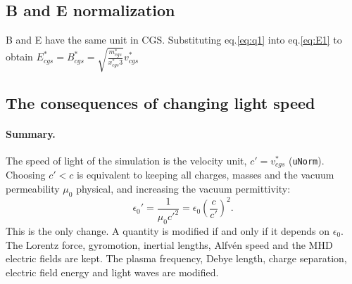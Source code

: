 \documentclass[a4paper, 11pt]{article}
\begin{document}
\subsection{B and E normalization}

B and E have the same unit in CGS. Substituting eq.\ref{eq:q1} into eq.\ref{eq:E1} to obtain $E_{cgs}^* = B_{cgs}^* = \sqrt{\frac{m_{cgs}^*}{x_{cgs}^*3}}v_{cgs}^*$ 

\subsection{The consequences of changing light speed}
\label{sec:light_speed}

\paragraph{Summary.} The speed of light of the simulation is the velocity unit, $c' = v_{cgs}^*$ (\texttt{uNorm}). Choosing $c' < c$ is equivalent to keeping all charges, masses and the vacuum permeability $\mu_0$ physical, and increasing the vacuum permittivity:
\begin{equation}
\epsilon_0' = \frac{1}{\mu_0 c'^2} = \epsilon_0 \left(\frac{c}{c'}\right)^2 .
\end{equation}
This is the only change. A quantity is modified if and only if it depends on $\epsilon_0$. The Lorentz force, gyromotion, inertial lengths, Alfv\'en speed and the MHD electric fields are kept. The plasma frequency, Debye length, charge separation, electric field energy and light waves are modified.
\end{document}

